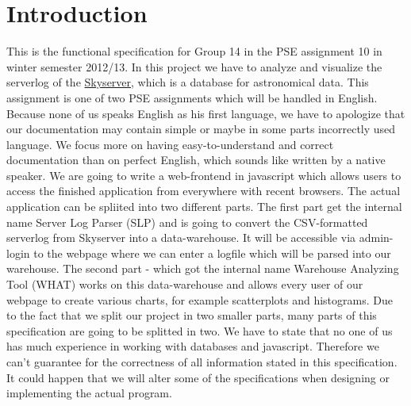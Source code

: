\section*{Introduction}
This is the functional specification for Group 14 in the PSE assignment 10 in winter semester 2012/13. 
In this project we have to analyze and visualize the serverlog of the 
\href{http://skyserver.sdss.org/public/en/}{Skyserver}, 
which is a database for astronomical data. This assignment is one of two PSE assignments which will be handled in English.
Because none of us speaks English as his first language, we have to apologize that our documentation may contain simple 
or maybe in some parts incorrectly used language. We focus more on having easy-to-understand and correct documentation 
than on perfect English, which sounds like written by a native speaker.
\newline\newline
We are going to write a web-frontend in javascript which allows users to access the finished application from everywhere
with recent browsers. The actual application can be spliited into two different parts. The first part get the internal name
Server Log Parser (SLP) and is going to convert the CSV-formatted serverlog from Skyserver into a data-warehouse. It will
be accessible via admin-login to the webpage where we can enter a logfile which will be parsed into our warehouse.
The second part - which got the internal name Warehouse Analyzing Tool (WHAT) works on this data-warehouse 
and allows every user of our webpage to create various charts, for example scatterplots and histograms.
Due to the fact that we split our project in two smaller parts, many parts of this specification 
are going to be splitted in two.
\newline
\newline
We have to state that no one of us has much experience in working with databases and javascript.
Therefore we can't guarantee for the correctness of all information stated in this specification.
It could happen that we will alter some of the specifications when designing or 
implementing the actual program.
